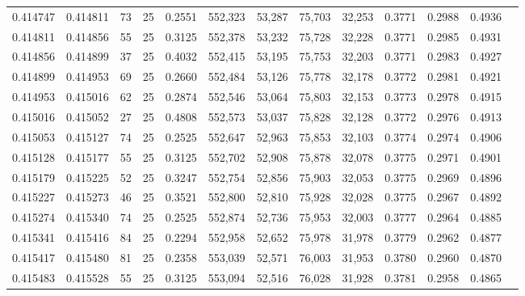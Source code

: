 \begin{tabular}{rrrrrrrrrrrrr}
0.414747 & 0.414811 &    73 &  25 &                                     0.2551 & 552,323 &  53,287 &  75,703 &  32,253 & 0.3771 & 0.2988 & 0.4936 \\
0.414811 & 0.414856 &    55 &  25 &                                     0.3125 & 552,378 &  53,232 &  75,728 &  32,228 & 0.3771 & 0.2985 & 0.4931 \\
0.414856 & 0.414899 &    37 &  25 &                                     0.4032 & 552,415 &  53,195 &  75,753 &  32,203 & 0.3771 & 0.2983 & 0.4927 \\
0.414899 & 0.414953 &    69 &  25 &                                     0.2660 & 552,484 &  53,126 &  75,778 &  32,178 & 0.3772 & 0.2981 & 0.4921 \\
0.414953 & 0.415016 &    62 &  25 &                                     0.2874 & 552,546 &  53,064 &  75,803 &  32,153 & 0.3773 & 0.2978 & 0.4915 \\
0.415016 & 0.415052 &    27 &  25 &                                     0.4808 & 552,573 &  53,037 &  75,828 &  32,128 & 0.3772 & 0.2976 & 0.4913 \\
0.415053 & 0.415127 &    74 &  25 &                                     0.2525 & 552,647 &  52,963 &  75,853 &  32,103 & 0.3774 & 0.2974 & 0.4906 \\
0.415128 & 0.415177 &    55 &  25 &                                     0.3125 & 552,702 &  52,908 &  75,878 &  32,078 & 0.3775 & 0.2971 & 0.4901 \\
0.415179 & 0.415225 &    52 &  25 &                                     0.3247 & 552,754 &  52,856 &  75,903 &  32,053 & 0.3775 & 0.2969 & 0.4896 \\
0.415227 & 0.415273 &    46 &  25 &                                     0.3521 & 552,800 &  52,810 &  75,928 &  32,028 & 0.3775 & 0.2967 & 0.4892 \\
0.415274 & 0.415340 &    74 &  25 &                                     0.2525 & 552,874 &  52,736 &  75,953 &  32,003 & 0.3777 & 0.2964 & 0.4885 \\
0.415341 & 0.415416 &    84 &  25 &                                     0.2294 & 552,958 &  52,652 &  75,978 &  31,978 & 0.3779 & 0.2962 & 0.4877 \\
0.415417 & 0.415480 &    81 &  25 &                                     0.2358 & 553,039 &  52,571 &  76,003 &  31,953 & 0.3780 & 0.2960 & 0.4870 \\
0.415483 & 0.415528 &    55 &  25 &                                     0.3125 & 553,094 &  52,516 &  76,028 &  31,928 & 0.3781 & 0.2958 & 0.4865 \\

\end{tabular}

